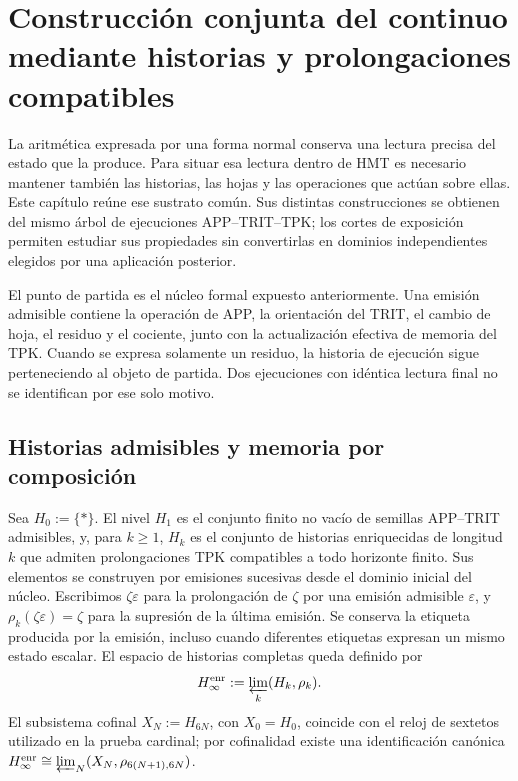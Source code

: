 \section{Construcción conjunta del continuo mediante historias y prolongaciones compatibles}
\label{iv:continuo-conjunto}
La aritmética expresada por una forma normal conserva una lectura precisa del estado que la produce. Para situar esa lectura dentro de HMT es necesario mantener también las historias, las hojas y las operaciones que actúan sobre ellas. Este capítulo reúne ese sustrato común. Sus distintas construcciones se obtienen del mismo árbol de ejecuciones APP–TRIT–TPK; los cortes de exposición permiten estudiar sus propiedades sin convertirlas en dominios independientes elegidos por una aplicación posterior.

El punto de partida es el núcleo formal expuesto anteriormente. Una emisión admisible contiene la operación de APP, la orientación del TRIT, el cambio de hoja, el residuo y el cociente, junto con la actualización efectiva de memoria del TPK. Cuando se expresa solamente un residuo, la historia de ejecución sigue perteneciendo al objeto de partida. Dos ejecuciones con idéntica lectura final no se identifican por ese solo motivo.



\subsection{Historias admisibles y memoria por composición}
Sea \(H_0:=\{\ast\}\). El nivel \(H_1\) es el conjunto finito no vacío de
semillas APP--TRIT admisibles, y, para \(k\geq1\), \(H_k\) es el conjunto de
historias enriquecidas de longitud \(k\) que admiten prolongaciones TPK
compatibles a todo horizonte finito. Sus elementos se construyen por emisiones
sucesivas desde el dominio inicial del núcleo. Escribimos \(\zeta\varepsilon\)
para la prolongación de \(\zeta\) por una emisión admisible \(\varepsilon\), y
\(\rho_k(\zeta\varepsilon)=\zeta\) para la supresión de la última emisión. Se
conserva la etiqueta producida por la emisión, incluso cuando diferentes
etiquetas expresan un mismo estado escalar. El espacio de historias completas
queda definido por
\[
 H_\infty^{\rm enr}:=\varprojlim_k(H_k,\rho_k).
\]
El subsistema cofinal \(X_N:=H_{6N}\), con \(X_0=H_0\), coincide con el reloj
de sextetos utilizado en la prueba cardinal; por cofinalidad existe una
identificación canónica
\(H_\infty^{\rm enr}\cong\varprojlim_N(X_N,\rho_{6(N+1),6N})\).

